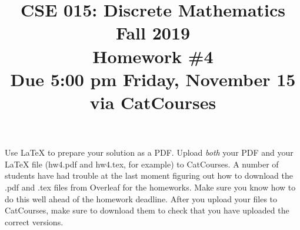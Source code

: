 \documentclass[11pt]{article}
\begin{document}
\title{\vspace{-1.5cm}CSE 015: Discrete Mathematics\\
Fall 2019\\
Homework \#4\\
Due 5:00 pm Friday, November 15 via CatCourses}
\date{}
\maketitle

\vspace{-1.5cm}

\noindent Use LaTeX to prepare your solution as a PDF. Upload \emph{both} your PDF and your LaTeX file (hw4.pdf and hw4.tex, for example) to CatCourses. A number of students have had trouble at the last moment figuring out how to download the .pdf and .tex files from Overleaf for the homeworks. Make sure you know how to do this well ahead of the homework deadline. After you upload your files to CatCourses, make sure to download them to check that you have uploaded the correct versions.
\end{document}
